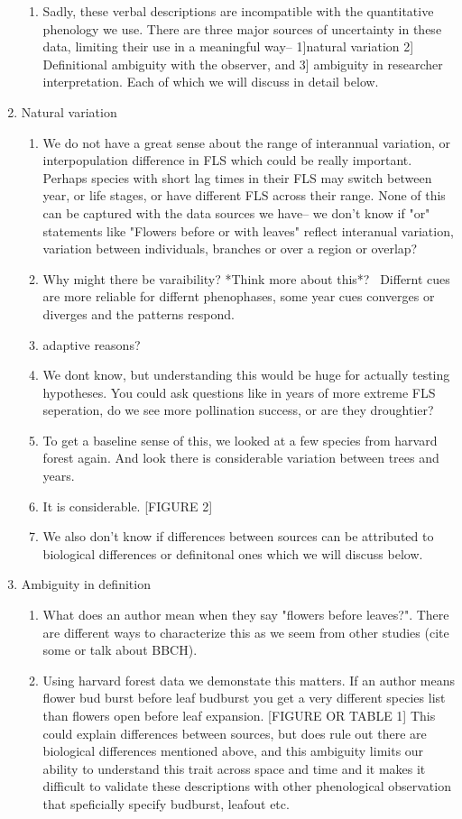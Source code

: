 \documentclass{article}\usepackage[]{graphicx}\usepackage[]{color}
\begin{document}
\begin{enumerate}
\begin{enumerate}
\item Sadly, these verbal descriptions are incompatible with the quantitative phenology we use. There are three major sources of uncertainty in these data, limiting their use in a meaningful way-- 1]natural variation 2] Definitional ambiguity with the observer, and 3] ambiguity in researcher interpretation. Each of which we will discuss in detail below.
\end{enumerate}
\item Natural variation
\begin{enumerate}
\item We do not have a great sense about the range of interannual variation, or interpopulation difference in FLS which could be really important. Perhaps species with short lag times in their FLS may switch between year, or life stages, or have different FLS across their range. None of this can be captured with the data sources we have-- we don't know if "or" statements like  "Flowers before or with leaves" reflect interanual variation, variation between individuals, branches or over a region or overlap?
\item Why might there be varaibility? *Think more about this*?
\ Differnt cues are more reliable for differnt phenophases, some year cues converges or diverges and the patterns respond.
\item adaptive reasons?
\item We dont know, but understanding this would be huge for actually testing hypotheses. You could ask questions like in years of more extreme FLS seperation, do we see more pollination success, or are they droughtier?
\item To get a baseline sense of this, we looked at a few species from harvard forest again. And look there is considerable variation between trees and years.
\item It is considerable. [FIGURE 2]
\item We also don't know if differences between sources can be attributed to biological differences or definitonal ones which we will discuss below.
\end{enumerate}
\item Ambiguity in definition
\begin{enumerate}
\item  What does an author mean when they say "flowers before leaves?". There are different ways to characterize this as we seem from other studies (cite some or talk about BBCH). 
\item Using harvard forest data we demonstate this matters. If an author means flower bud burst before leaf budburst you get a very different species list than flowers open before leaf expansion. [FIGURE OR TABLE 1] This could explain differences between sources, but does rule out there are biological differences mentioned above, and this ambiguity limits our ability to understand this trait across space and time and it makes it difficult to validate these descriptions with other phenological observation that speficially specify budburst, leafout etc.

\end{enumerate}
\end{enumerate}
\end{document}

